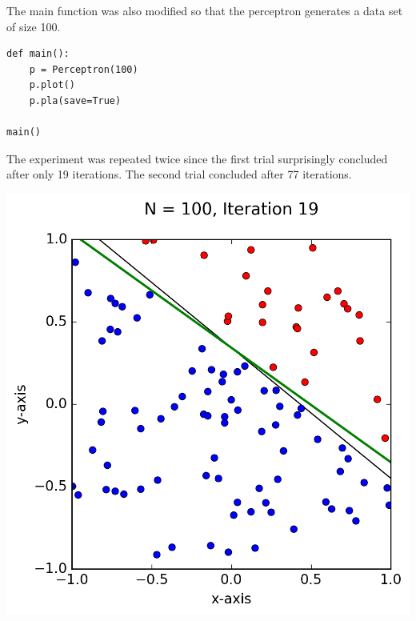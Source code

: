 \documentclass[a4paper]{article}
\begin{document}
\begin {description}
\begin{doublespace}
\begin{enumerate}[(a)]
\newpage

The main function was also modified so that the perceptron generates a data set of size 100.

\begin{lstlisting}[frame=single]
def main():
    p = Perceptron(100)
    p.plot()
    p.pla(save=True)

main()
\end{lstlisting}

The experiment was repeated twice since the first trial surprisingly concluded after only 19 iterations. The second trial concluded after 77 iterations.

\begin{center}
\includegraphics[scale=0.5]{Problem_4d1.png}

\end{center}
\end{enumerate}
\end{doublespace}
\end{description}
\end{document}

